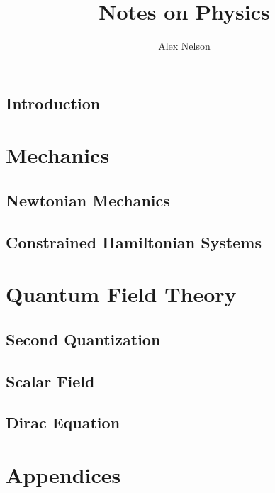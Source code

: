 \documentclass[graybox,envcountchap,sectrefs,vecphys,nospthms]{svmono}
\begin{document}
\frontmatter%

\hypersetup{pageanchor=false}
\title{Notes on Physics}
\author{Alex Nelson}
\maketitle

\preface %
\hypersetup{pageanchor=true}


\tableofcontents

\mainmatter%
\chapter{Introduction}


\part{Mechanics}
\chapter{Newtonian Mechanics}



\chapter{Constrained Hamiltonian Systems}


\part{Quantum Field Theory}
\chapter{Second Quantization}

\chapter{Scalar Field}

\chapter{Dirac Equation}


\backmatter%
\part{Appendices}
\appendix
\printbibliography[heading=bibintoc]
\clearpage
{}
\printindex
\end{document}
